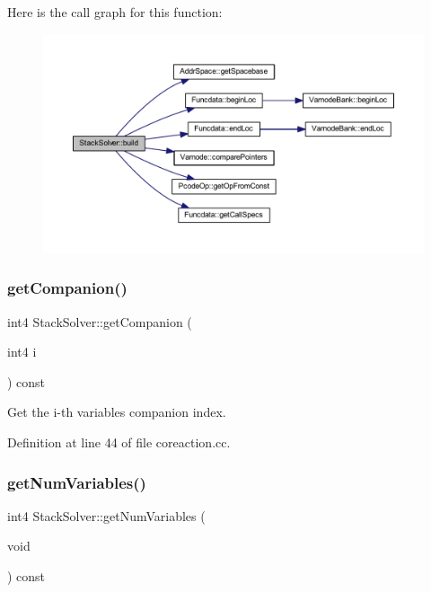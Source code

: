 Here is the call graph for this function\+:
\nopagebreak
\begin{figure}[H]
\begin{center}
\leavevmode
\includegraphics[width=350pt]{class_stack_solver_a136feaaa59c88d2a2b003621a78b0511_cgraph}
\end{center}
\end{figure}
\mbox{\label{class_stack_solver_a0afca12bc9607e6846fd722e20265150}} 
\subsubsection{\texorpdfstring{getCompanion()}{getCompanion()}}
{\footnotesize\ttfamily int4 Stack\+Solver\+::get\+Companion (\begin{DoxyParamCaption}\item[{int4}]{i }\end{DoxyParamCaption}) const\hspace{0.3cm}{\ttfamily [inline]}}



Get the i-\/th variable\textquotesingle{}s companion index. 



Definition at line 44 of file coreaction.\+cc.

\mbox{\label{class_stack_solver_ad89900d198c2372dafd1b7d5c6f17787}} 
\subsubsection{\texorpdfstring{getNumVariables()}{getNumVariables()}}
{\footnotesize\ttfamily int4 Stack\+Solver\+::get\+Num\+Variables (\begin{DoxyParamCaption}\item[{void}]{ }\end{DoxyParamCaption}) const\hspace{0.3cm}{\ttfamily [inline]}}



